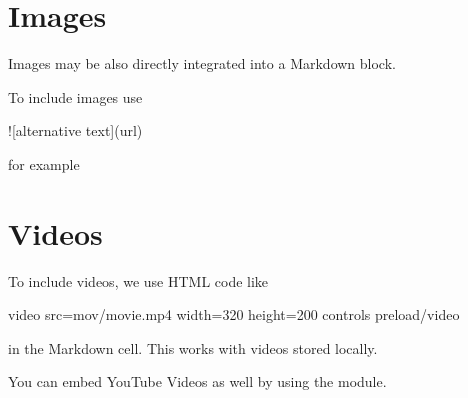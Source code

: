 \documentclass[letterpaper,10pt,english]{sphinxmanual}
\let\sphinxpxdimen\pdfpxdimen\else\newdimen\sphinxpxdimen
\begin{document}
\begin{sphinxVerbatim}[commandchars=\\\{\}]
\end{sphinxVerbatim}


\section{Images}
\label{\detokenize{notebooks/Intro/EditCells:Images}}
\sphinxAtStartPar
Images may be also directly integrated into a Markdown block.

\sphinxAtStartPar
To include images use

\begin{sphinxVerbatim}[commandchars=\\\{\}]
![alternative text](url)
\end{sphinxVerbatim}

\sphinxAtStartPar
for example

\noindent\sphinxincludegraphics[width=200\sphinxpxdimen,height=200\sphinxpxdimen]{{particle}.png}


\section{Videos}
\label{\detokenize{notebooks/Intro/EditCells:Videos}}
\sphinxAtStartPar
To include videos, we use HTML code like

\begin{sphinxVerbatim}[commandchars=\\\{\}]
\PYGZlt{}video src=\PYGZdq{}mov/movie.mp4\PYGZdq{} width=\PYGZdq{}320\PYGZdq{} height=\PYGZdq{}200\PYGZdq{} controls preload\PYGZgt{}\PYGZlt{}/video\PYGZgt{}
\end{sphinxVerbatim}

\sphinxAtStartPar
in the Markdown cell. This works with videos stored locally.





\sphinxAtStartPar
You can embed YouTube Videos as well by using the  module.
\end{document}
